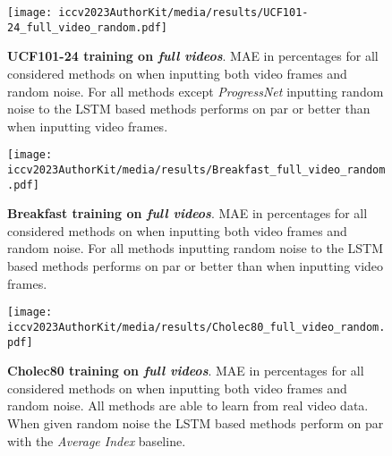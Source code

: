 \begin{figure}
\begin{center}
   \texttt{[image: iccv2023AuthorKit/media/results/UCF101-24\_full\_video\_random.pdf]}
\end{center}
   \caption{\textbf{UCF101-24 training on \textsl{full videos}}. MAE in percentages for all considered methods on when inputting both video frames and random noise. For all methods except \textsl{ProgressNet} inputting random noise to the LSTM based methods performs on par or better than when inputting video frames.
   }
\label{fig:result_ucf_seq}
\end{figure}
\begin{figure}
\begin{center}
   \texttt{[image: iccv2023AuthorKit/media/results/Breakfast\_full\_video\_random.pdf]}
\end{center}
   \caption{\textbf{Breakfast training on \textsl{full videos}}. 
   MAE in percentages for all considered methods on when inputting both video frames and random noise. For all methods inputting random noise to the LSTM based methods performs on par or better than when inputting video frames.}
\label{fig:result_breakfast_seq}
\end{figure}
\begin{figure}
\begin{center}
   \texttt{[image: iccv2023AuthorKit/media/results/Cholec80\_full\_video\_random.pdf]}
\end{center}
   \caption{\textbf{Cholec80 training on \textsl{full videos}}. 
   MAE in percentages for all considered methods on when inputting both video frames and random noise. All methods are able to learn from real video data. When given random noise the LSTM based methods perform on par with the \textsl{Average Index} baseline.}
\label{fig:result_cholec_seq}
\end{figure}


